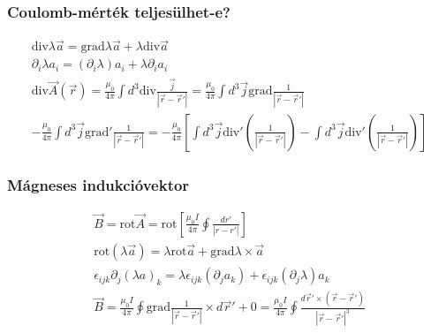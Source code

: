\documentclass{article}
\begin{document}
\subsubsection{Coulomb-mérték teljesülhet-e?}
\begin{gather*}
\mathrm{div} \lambda \vec{a} = \mathrm{grad} \lambda \vec{a} + \lambda \mathrm{div} \vec{a} \\
\partial_i \lambda a_i = (\partial_i \lambda)a_i + \lambda \partial_i a_i \\
\mathrm{div} \vec{A} (\vec{r}) = \frac{\mu_0}{4\pi} \int d^3 \mathrm{div} \frac{\vec{j}}{|\vec{r}-\vec{r}'|} = \frac{\mu_0}{4\pi} \int d^3  \vec{j} \mathrm{grad}\frac{1}{|\vec{r}-\vec{r}'|} \\
-\frac{\mu_0}{4\pi} \int d^3  \vec{j} \mathrm{grad}'\frac{1}{|\vec{r}-\vec{r}'|} = -\frac{\mu_0}{4\pi} \left[  \int d^3  \vec{j} \mathrm{div}'\left( \frac{1}{|\vec{r}-\vec{r}'|} \right) -\int d^3  \vec{j} \mathrm{div}'\left( \frac{1} {|\vec{r}-\vec{r}'|} \right)    \right] 
\end{gather*}

\subsubsection{Mágneses indukcióvektor}
\begin{gather*}
\vec{B} = \mathrm{rot} \vec{A} = \mathrm{rot} \left[ \frac{\mu_0I}{4\pi} \oint \frac{dr'}{|r-r'|} \right] \\
\mathrm{rot} (\lambda \vec{a}) = \lambda \mathrm{rot} \vec{a} + \mathrm{grad} \lambda \times \vec{a} \\
\epsilon_{ijk} \partial_j (\lambda a)_k = \lambda \epsilon_{ijk}(\partial_j a_k) + \epsilon_{ijk} (\partial_j \lambda) a_k \\
\vec{B} = \frac{\mu_0 I}{4\pi} \oint \mathrm{grad} \frac{1}{|\vec{r}-\vec{r}'|} \times d\vec{r}' + 0 =  \frac{\mu_0 I}{4\pi} \oint \frac{d\vec{r}' \times (\vec{r}-\vec{r}')}{|\vec{r}-\vec{r}'|^3}
\end{gather*}
\end{document}
